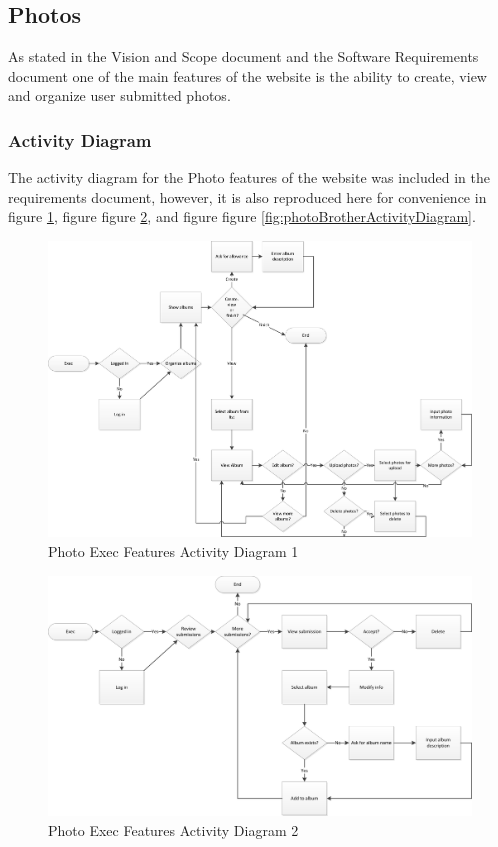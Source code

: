 \documentclass{article}
\begin{document}
\subsection{Photos}

As stated in the Vision and Scope document and the Software Requirements document one of the main features of the website is the ability to create, view and organize user submitted photos.

\subsubsection{Activity Diagram}
The activity diagram for the Photo features of the website was included in the requirements document, however, it is also reproduced here for convenience in figure \ref{fig:photoExec1ActivityDiagram}, figure figure \ref{fig:photoExec2ActivityDiagram}, and figure figure \ref{fig:photoBrotherActivityDiagram}.

\FloatBarrier
\begin{figure}
\centering
\includegraphics[scale=.65]{img/activityDiagrams/photoActivity1_1}
\caption{Photo Exec Features Activity Diagram 1}
\label{fig:photoExec1ActivityDiagram}
\end{figure}
\FloatBarrier

\FloatBarrier
\begin{figure}
\centering
\includegraphics[scale=.65]{img/activityDiagrams/photoActivity1_2}
\caption{Photo Exec Features Activity Diagram 2}
\label{fig:photoExec2ActivityDiagram}
\end{figure}
\FloatBarrier
\end{document}
